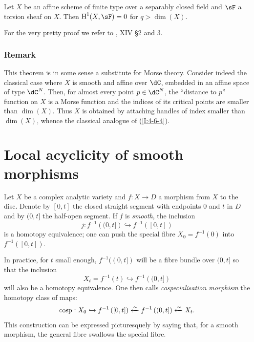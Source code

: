 \begin{theorem}\label{I:4-6-4}
Let $X$ be an affine scheme of finite type over a separably closed field and
$\sF$ a torsion sheaf on $X$. Then $\h^1(X,\sF) = 0$ for
$q>\dim(X)$.
\end{theorem}

For the very pretty proof we refer to \cite{sga4}, XIV \S 2 and 3. 





\subsubsection{Remark}\label{I:4-6-5}

This theorem is in some sense a substitute for Morse theory.
Consider indeed the classical case where $X$ is smooth and affine over $\dC$,
embedded in an affine space of type $\dC^N$. Then, for almost every point
$p\in\dC^N$, the ``distance to $p$'' function on $X$ is a Morse function
and the indices of its critical points are smaller than $\dim(X)$. Thus
$X$ is obtained by attaching handles of index smaller than $\dim(X)$, whence
the classical analogue of (\ref{I:4-6-4}). 




















\section{Local acyclicity of smooth morphisms}\label{I:5}

Let $X$ be a complex analytic variety and $f:X\to D$ a morphism from
$X$ to the disc. Denote by $[0,t]$ the closed straight segment with endpoints
$0$ and $t$ in $D$ and by $(0,t]$ the half-open segment. If $f$ is \emph{smooth},
the inclusion
\[
  j : f^{-1}\left((0,t]\right) \hookrightarrow f^{-1}\left([0,t]\right)
\]
is a homotopy equivalence; one can push the special fibre
$X_0=f^{-1}(0)$ into $f^{-1}([0,t])$.

In practice, for $t$ small enough, $f^{-1}((0,t])$ will be a fibre bundle over
$(0,t]$ so that the inclusion
\[
  X_t = f^{-1}(t) \hookrightarrow f^{-1}\left((0,t]\right)
\]
will also be a homotopy equivalence. One then calls \emph{cospecialisation
morphism} the homotopy class of maps:
\[
  \operatorname{cosp} : X_0 \hookrightarrow f^{-1}\left([0,t]\right) \xleftarrow\sim f^{-1}\left((0,t]\right) \xleftarrow\sim X_t \text{.}
\]
This construction can be expressed picturesquely by saying that, for a
smooth morphism, the general fibre swallows the special fibre.

